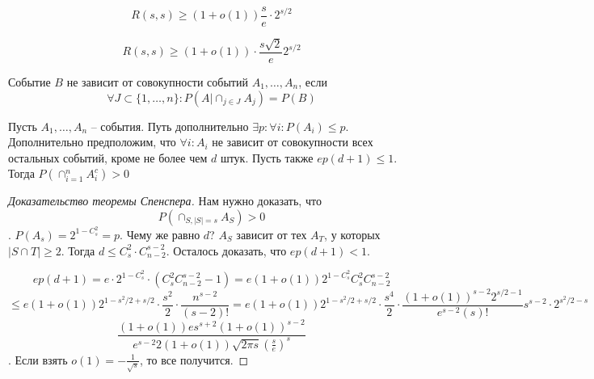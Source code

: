 \documentclass[document.tex]{subfiles}
\begin{document}
\begin{theorem}[Эрдеша]
	$$R(s, s) \geq (1+o(1)) \frac{s}{e} \cdot 2^{s/2}$$	
\end{theorem}

\begin{theorem}[Спенсера]
	$$R(s, s) \geq (1+o(1)) \cdot \frac{s\sqrt{2}}{e} 2^{s/2}$$
	
\end{theorem}

\begin{definition}
	Событие $B$ не зависит от совокупности событий $A_1, \ldots, A_n$, если $$\forall J \subset \{1, \ldots, n\}: P(A | \cap_{j \in J} A_j) = P(B)$$
\end{definition}

\begin{lemma}
	Пусть $A_1, \ldots, A_n$ -- события. Путь дополнительно $\exists p : \forall i : P(A_i) \leq p$. Дополнительно предположим, что $\forall i : A_i$ не зависит от совокупности всех остальных событий, кроме не более чем $d$ штук. Пусть также $ep(d+1) \leq 1$. Тогда $P(\cap_{i=1}^nA_i^c) > 0$
\end{lemma}

\begin{proof}[Доказательство теоремы Спенспера]
	Нам нужно доказать, что $$P(\cap_{S, |S| = s} A_S) > 0$$. $P(A_s) = 2^{1 - C_s^2} = p$. Чему же равно $d$? $A_S$ зависит от тех $A_T$, у которых $|S \cap T| \geq 2$. Тогда $d \leq C_s^2 \cdot C_{n-2}^{s-2}$. Осталось доказать, что $ep(d+1) < 1$.

	$$ep(d+1) = e \cdot 2^{1 - C_s^2} \cdot (C_s^2 C_{n-2}^{s-2} - 1) = e(1+o(1))2^{1 - C_s^2}C_s^2C_{n-2}^{s-2}$$
	$$\leq e (1+o(1)) 2^{1 - s^2/2 + s/2} \cdot \frac{s^2}{2} \cdot \frac{n^{s-2}}{(s-2)!} = e (1+o(1)) 2^{1 - s^2/2 + s/2} \cdot \frac{s^4}{2} \cdot \frac{(1+o(1))^{s-2} 2^{s/2 - 1} }{e^{s-2}(s)!}s^{s-2}\cdot 2^{s^2/2-s}$$
	$$\frac{(1+o(1))es^{s+2}(1+o(1))^{s-2}}{e^{s-2}2(1+o(1))\sqrt{2 \pi s} \left(\frac{s}{e}\right)^{s}}$$. Если взять $o(1) = -\frac{1}{\sqrt{s}}$, то все получится.
\end{proof}

\begin{lemma}
	
\end{lemma}
\end{document}
